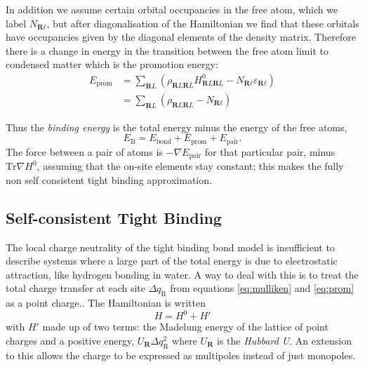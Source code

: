 \documentclass{article}
\begin{document}
\begin{multicols}{2}
In addition we assume certain orbital occupancies in the free atom, which we label $N_{\textbf{R}\ell}$, but after diagonalisation of the Hamiltonian we find that these orbitals have occupancies given by the diagonal elements of the density matrix. Therefore there is a change in energy in the transition between the free atom limit to condensed matter which is the promotion energy: 
\begin{equation}
\label{eq:prom}
	\begin{split}
		E_{\text{prom}}&=\sum_{\textbf{R}L}(\rho_{\textbf{R}L\textbf{R}L}H^{0}_{\textbf{R}L\textbf{R}L}-N_{\textbf{R}\ell}\varepsilon_{\textbf{R}\ell} )\\
		&=\sum_{\textbf{R}L}(\rho_{\textbf{R}L\textbf{R}L}-N_{\textbf{R}\ell})
	\end{split}
\end{equation}

Thus the \textit{binding energy} is the total energy minus the energy of the free atoms,
\begin{equation}
	E_{\text{B}}=E_{\text{bond}}+E_{\text{prom}}+E_{\text{pair}}.
\end{equation}
The force between a pair of atoms is $-\nabla E_{\text{pair}}$ for that particular pair, minus $\text{Tr}\nabla H^{0}$, assuming that the on-site elements stay constant; this makes the fully non self consistent tight binding approximation.

\subsection{Self-consistent Tight Binding}
\label{sec:Self_consistent}

The local charge neutrality of the tight binding bond model is insufficient to describe systems where a large part of the total energy is due to electrostatic attraction, like hydrogen bonding in water. A way to deal with this is to treat the total charge transfer at each site $\Delta q_{\text{R}}$ from equations \ref{eq:mulliken} and \ref{eq:prom} as a point charge.\cite{hafner2013structures,majewski1986crystal}. The Hamiltonian is written
\begin{equation}
	H=H^{0}+H'
\end{equation}
with $H'$ made up of two terms: the Madelung energy of the lattice of point charges \cite{Madelung1919} and a positive energy, $U_{\textbf{R}}\Delta q_{\text{R}}^{2}$ where $U_{\textbf{R}}$ is the \textit{Hubbard U}.\cite{Hubbard1963} An extension to this allows the charge to be expressed as multipoles instead of just monopoles.\cite{Finnis1998,schelling1998self}


\end{multicols}
\end{document}
